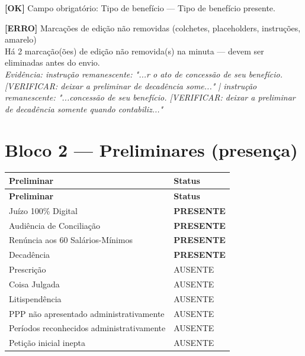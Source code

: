 \documentclass[12pt,a4paper]{article}
\newcommand{\statusOK}[1]{\textcolor{corOK}{\textbf{[OK]}} #1}
\newcommand{\statusERRO}[1]{\textcolor{corERRO}{\textbf{[ERRO]}} #1}
\begin{document}
\medskip
\statusOK{Campo obrigatório: Tipo de benefício} --- Tipo de benefício presente.

\medskip
\statusERRO{Marcações de edição não removidas (colchetes, placeholders, instruções, amarelo)}\\
Há 2 marcação(ões) de edição não removida(s) na minuta --- devem ser eliminadas antes do envio.\\
\textit{Evidência: instrução remanescente: "...r o ato de concessão de seu benefício. [VERIFICAR: deixar a preliminar de decadência some..." | instrução remanescente: "...concessão de seu benefício. [VERIFICAR: deixar a preliminar de decadência somente quando contabiliz..."}

\section{Bloco 2 --- Preliminares (presença)}

\begin{longtable}{p{8.5cm} p{4.5cm}}
  \toprule
  \textbf{Preliminar} & \textbf{Status} \\
  \midrule
  \endfirsthead
  \toprule
  \textbf{Preliminar} & \textbf{Status} \\
  \midrule
  \endhead
  Juízo 100\% Digital                           & \textcolor{corOK}{\textbf{PRESENTE}} \\
  Audiência de Conciliação                      & \textcolor{corOK}{\textbf{PRESENTE}} \\
  Renúncia aos 60 Salários-Mínimos              & \textcolor{corOK}{\textbf{PRESENTE}} \\
  Decadência                                    & \textcolor{corOK}{\textbf{PRESENTE}} \\
  Prescrição                                    & AUSENTE \\
  Coisa Julgada                                 & AUSENTE \\
  Litispendência                                & AUSENTE \\
  PPP não apresentado administrativamente       & AUSENTE \\
  Períodos reconhecidos administrativamente     & AUSENTE \\
  Petição inicial inepta                        & AUSENTE \\
  \bottomrule
\end{longtable}
\end{document}
